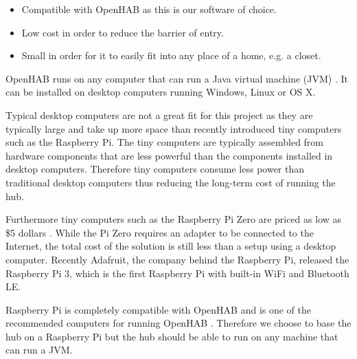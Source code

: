 \begin{itemize}
\item Compatible with OpenHAB as this is our software of choice.
\item Low cost in order to reduce the barrier of entry.
\item Small in order for it to easily fit into any place of a home, e.g. a closet.
\end{itemize}

OpenHAB runs on any computer that can run a Java virtual machine (JVM) \cite{openhab:introduction}. It can be installed on desktop computers running Windows, Linux or OS X.

Typical desktop computers are not a great fit for this project as they are typically large and take up more space than recently introduced tiny computers such as the Raspberry Pi. The tiny computers are typically assembled from hardware components that are less powerful than the components installed in desktop computers. Therefore tiny computers consume less power than traditional desktop computers thus reducing the long-term cost of running the hub.

Furthermore tiny computers such as the Raspberry Pi Zero are priced as low as \$5 dollars \cite{raspberrypi:zero}. While the Pi Zero requires an adapter to be connected to the Internet, the total cost of the solution is still less than a setup using a desktop computer. Recently Adafruit, the company behind the Raspberry Pi, released the Raspberry Pi 3, which is the first Raspberry Pi with built-in WiFi and Bluetooth LE.

Raspberry Pi is completely compatible with OpenHAB and is one of the recommended computers for running OpenHAB \cite{openhab:hardware}. Therefore we choose to base the hub on a Raspberry Pi but the hub should be able to run on any machine that can run a JVM.

